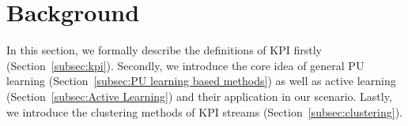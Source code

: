 \section{Background}
\label{sec:Background}
In this section, we formally describe the deﬁnitions of KPI firstly (Section~\ref{subsec:kpi}). Secondly, we introduce the core idea of general PU learning (Section~\ref{subsec:PU learning based methods})  as well as active learning (Section~\ref{subsec:Active Learning}) and their application in our scenario. Lastly, we introduce the clustering methods of KPI streams (Section~\ref{subsec:clustering}).

\begin{figure}
    \centering
      

\end{figure}
